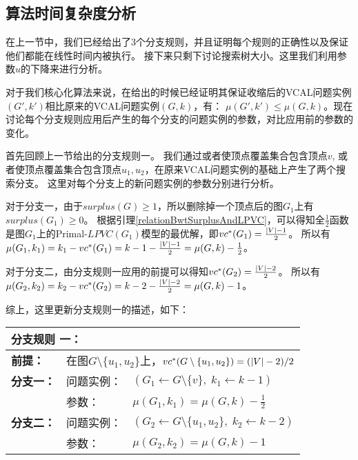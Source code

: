 \subsection{算法时间复杂度分析}
在上一节中，我们已经给出了3个分支规则，并且证明每个规则的正确性以及保证他们都能在线性时间内被执行。
接下来只剩下讨论搜索树大小。这里我们利用参数$u$的下降来进行分析。

对于我们核心化算法来说，在给出的时候已经证明其保证收缩后的VCAL问题实例$(G', k')$相比原来的VCAL问题实例$(G, k)$，有：
$\mu(G', k') \le \mu(G,  k)$。现在讨论每个分支规则应用后产生的每个分支的问题实例的参数，对比应用前的参数的变化。

\vspace{0.5cm}

首先回顾上一节给出的分支规则一。
我们通过或者使顶点覆盖集合包含顶点$v$, 或者使顶点覆盖集合包含顶点$u_1, u_2$，在原来VCAL问题实例的基础上产生了两个搜索分支。
这里对每个分支上的新问题实例的参数分别进行分析。

对于分支一，由于$surplus(G) \ge 1$，所以删除掉一个顶点后的图$G_1$上有$surplus(G_1) \ge 0$。
根据引理\ref{relationBwtSurplusAndLPVC}，可以得知全$\frac{1}{2}$函数是图$G_1$上的Primal-$LPVC(G_1)$模型的最优解，即$vc^*(G_1) = \frac{\left\vert V \right\vert - 1}{2}$。
所以有$\mu(G_1, k_1) = k_1 - vc^*(G_1) = k - 1 - \frac{\left\vert V \right\vert - 1}{2} = \mu(G, k) - \frac{1}{2}$。

对于分支二，由分支规则一应用的前提可以得知$vc^*(G_2) = \frac{\left\vert V \right\vert - 2}{2}$。
所以有$\mu(G_2, k_2) = k_2 - vc^*(G_2) = k - 2 - \frac{\left\vert V \right\vert - 2}{2} = \mu(G, k) - 1$。

综上，这里更新分支规则一的描述，如下：\\

\begin{tabular}{ p{0.12\headwidth} | p{0.12\headwidth}p{0.66\headwidth} }
  \multicolumn{3}{l}{ \textbf{分支规则 一：} }\\
  \hline
  \textbf{前提：}  & \multicolumn{2}{l}{在图$G \setminus \{u_1, u_2\}$上，$vc^*(G \setminus \{u_1, u_2\}) = (\left\vert V \right\vert - 2) / 2$}\\
  \hline
  \textbf{分支一：} & 问题实例：&$(G_1 \leftarrow G \setminus \{v\},\; k_1 \leftarrow k - 1)$ \\
                    & 参数：&$\mu(G_1, k_1) = \mu(G, k) - \frac{1}{2}$\\
  \hline
  \textbf{分支二：} & 问题实例：&$(G_2 \leftarrow G \setminus \{u_1, u_2\},\; k_2 \leftarrow k - 2)$\\
                    & 参数：&$\mu(G_2, k_2) = \mu(G, k) - 1$\\
  \hline
\end{tabular} \vspace{0.5cm}  

